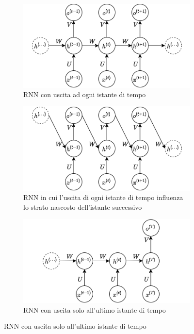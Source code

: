 \documentclass[../../main.tex]{subfiles}
\begin{document}
\begin{figure}[H]
    \centering
    \begin{subfigure}[t]{0.49\textwidth}
        \centering
        \includegraphics[width = \textwidth]{immagini/4_2/recnet.png}
        \caption{RNN con uscita ad ogni istante di tempo}
        \label{fig:RNNArch1}
    \end{subfigure}
    \begin{subfigure}[t]{0.49\textwidth}
        \centering
        \includegraphics[width = \textwidth]{immagini/4_2/recnet2.png}      
        \caption{RNN in cui l'uscita di ogni istante di tempo influenza lo strato nascosto dell'istante successivo}  
        \label{fig:RNNArch2}
    \end{subfigure}
    \begin{subfigure}[t]{0.49\textwidth}
        \centering
        \includegraphics[width = \textwidth]{immagini/4_2/recnet3.png}  
        \caption{RNN con uscita solo all'ultimo istante di tempo} 
        \label{fig:RNNArch3}  
    \end{subfigure}
\end{figure}
\end{document}
